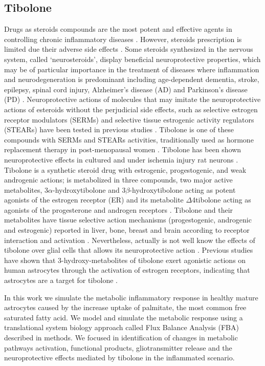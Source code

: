 \subsection*{Tibolone}
Drugs as steroids compounds are the most potent and effective agents in controlling chronic inflammatory diseases \cite{Laveti2013}. However, steroids prescription is limited due their adverse side effects \cite{Albertazzi1998}. Some steroids synthesized in the nervous system, called ‘neurosteroids’, display beneficial neuroprotective properties, which may be of particular importance in the treatment of diseases where inflammation and neurodegeneration is predominant including age-dependent dementia, stroke, epilepsy, spinal cord injury, Alzheimer’s disease (AD) and Parkinson’s disease (PD) \cite{Wojtal2006}. Neuroprotective actions of molecules that may imitate the neuroprotective actions of esteroids without the perjudicial side effects, such as selective estrogen receptor modulators (SERMs) and selective tissue estrogenic activity regulators (STEARs) have been tested in previous studies \cite{Kloosterboer2001,Sharma2006}. Tibolone is one of these compounds with SERMs and STEARs activities, traditionally used as hormone replacement therapy in post-menopausal women \cite{Timmer2002}. Tibolone has been shown neuroprotective effects in cultured and under ischemia injury rat neurons \cite{Altinoz2009}. Tibolone is a synthetic steroid drug with estrogenic, progestogenic, and weak androgenic actions; is metabolized in three compounds, two major active metabolites, 3$\alpha$-hydroxytibolone and 3$\beta$-hydroxytibolone acting as potent agonists of the estrogen receptor (ER) and its metabolite $\Delta$4tibolone acting as agonists of the progesterone and androgen receptors \cite{Kloosterboer2004}. Tibolone and their metabolites have tissue selective action mechanisms (progestogenic, androgenic and estrogenic) reported in liver, bone, breast and brain according to receptor interaction and activation \cite{Kloosterboer2001}. Nevertheless, actually is not well know the effects of tibolone over glial cells that allows its neuroprotective action \cite{Avila-Rodriguez2014}. Previous studies have shown that 3-hydroxy-metabolites of tibolone exert agonistic actions on human astrocytes through the activation of estrogen receptors, indicating that astrocytes are a target for tibolone \cite{Altinoz2009}.

In this work we simulate the metabolic inflammatory response in healthy mature astrocytes caused by the increase uptake of palmitate, the most common free saturated fatty acid. We model and simulate the metabolic response using a translational system biology approach called Flux Balance Analysis (FBA) described in methods. We focused in identification of changes in metabolic pathways activation, functional products, gliotransmitter release and the neuroprotective effects mediated by tibolone in the inflammated scenario.
